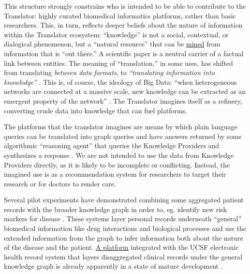 This structure strongly constrains who is intended to be able to
contribute to the Translator: highly curated biomedical informatics
platforms, rather than basic researchers. This, in turn, reflects deeper
beliefs about the nature of information within the Translator ecosystem:
``knowledge'' is not a social, contextual, or dialogical phenomenon, but
a ``natural resource'' that can be
\href{https://reporter.nih.gov/project-details/10548337}{mined} from
information that is ``out there.'' A scientific paper is a neutral
carrier of a factual link between entities. The meaning of
``translation,'' in some uses, has shifted from translating
\emph{between data formats}, to \emph{``translating information into
knowledge''} \cite{consortiumUniversalBiomedicalData2019} . This
is, of course, the ideology of Big Data: ``when heterogeneous networks
are connected at a massive scale, new knowledge can be extracted as an
emergent property of the network'' \cite{morrisScalablePrecisionMedicine2023} . The Translator imagines itself
as a refinery, converting crude data into knowledge that can fuel
platforms.

The platforms that the translator imagines are means by which plain
language queries can be translated into graph queries and have answers
returned by some algorithmic ``reasoning agent'' that queries the
Knowledge Providers and synthesizes a response \cite{renaissancecomputinginstituterenciBiomedicalDataTranslator2022, renaissancecomputinginstituterenciUseCasesShow2022, goelExplanationContainerCaseBased2021, unniBiolinkModelUniversal2022, hailuNIHfundedProjectAims2019} . We are not intended to use the data
from Knowledge Providers directly, as it is likely to be incomplete or
conflicting. Instead, the imagined use is as a recommendation system for
researchers to target their research or for doctors to render care.

Several pilot experiments have demonstrated combining some aggregated
patient records with the broader knowledge graph in order to, eg.
identify new risk markers for disease \cite{morrisScalablePrecisionMedicine2023, nelsonEmbeddingElectronicHealth2021, translatorconsortiumClinicalDataServices2020, nelsonIntegratingBiomedicalResearch2019} . These systems layer
personal records underneath ``general'' biomedical information like drug
interactions and biological processes and use the extended information
from the graph to infer information both about the nature of the disease
and the patient. \href{https://www.matebioservices.com/bridge}{A
platform} integrated with the UCSF electronic health record system that
layers disaggregated clinical records under the general knowledge graph
is already apparently in a state of mature development \cite{universityofcaliforniasanfranciscoBRIDGE} .

